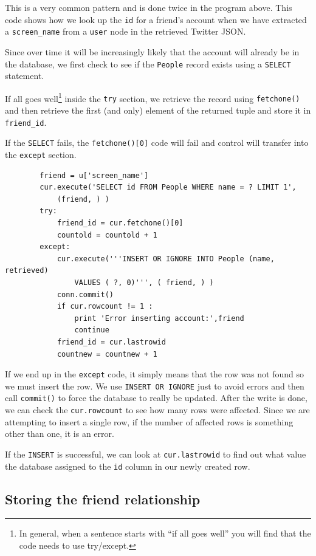 This is a very common pattern and is done twice in the program above.
This code shows how we look up the {\tt id} for a 
friend's account when we have extracted a \verb"screen_name"
from a {\tt user} node in the retrieved Twitter JSON.

Since over time it will be increasingly likely that the account
will already be in the database, we first check to see if the
{\tt People} record exists using a {\tt SELECT} statement.

If all goes well\footnote{In general, when a sentence starts 
with ``if all goes well'' you will find that the code needs
to use try/except.} inside the {\tt try} section, we retrieve the
record using {\tt fetchone()} and then retrieve the
first (and only) element of the returned tuple and store it in 
\verb"friend_id".

If the {\tt SELECT} fails, the {\tt fetchone()[0]} code will fail
and control will transfer into the {\tt except} section.

\beforeverb
\begin{verbatim}
        friend = u['screen_name']
        cur.execute('SELECT id FROM People WHERE name = ? LIMIT 1',
            (friend, ) )
        try:
            friend_id = cur.fetchone()[0]
            countold = countold + 1
        except:
            cur.execute('''INSERT OR IGNORE INTO People (name, retrieved) 
                VALUES ( ?, 0)''', ( friend, ) )
            conn.commit()
            if cur.rowcount != 1 :
                print 'Error inserting account:',friend
                continue
            friend_id = cur.lastrowid
            countnew = countnew + 1
\end{verbatim}
\afterverb
%
If we end up in the {\tt except} code, it simply means that the row
was not found so we must insert the row.  We use {\tt INSERT OR 
IGNORE} just to avoid errors and then call {\tt commit()} to 
force the database to really be updated.  After the write is done, we can 
check the {\tt cur.rowcount} to see how many rows were affected.  Since
we are attempting to insert a single row, if the number of 
affected rows is something other than one, it is an error.  

If the {\tt INSERT} is successful, we can look at {\tt cur.lastrowid} 
to find out what value the database assigned to the {\tt id} column in 
our newly created row.

\subsection{Storing the friend relationship}

